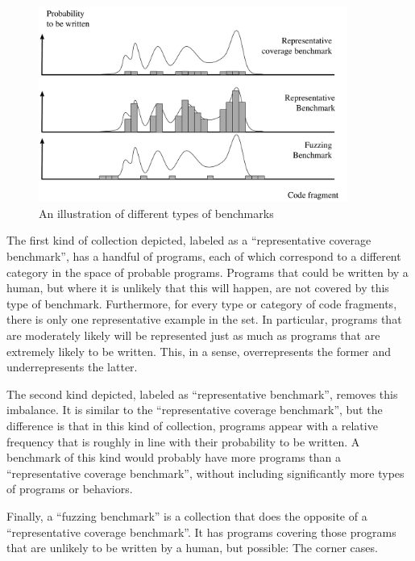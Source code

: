 \begin{figure}[h]
	\centering
	\includegraphics[width=0.9\textwidth]{figures/benchmark_types.pdf}
	\caption{An illustration of different types of benchmarks}
	\label{fig:benchmark_types}
\end{figure}

The first kind of collection depicted, labeled as a ``representative coverage benchmark'', has a handful of programs, each of which correspond to a different category in the space of probable programs.
Programs that could be written by a human, but where it is unlikely that this will happen, are not covered by this type of benchmark. Furthermore, for every type or category of code fragments, there is only one representative example in the set.
In particular, programs that are moderately likely will be represented just as much as programs that are extremely likely to be written. This, in a sense, overrepresents the former and underrepresents the latter.

The second kind depicted, labeled as ``representative benchmark'', removes this imbalance. It is similar to the ``representative coverage benchmark'', but the difference is that in this kind of collection, programs appear with a relative frequency that is roughly in line with their probability to be written.
A benchmark of this kind would probably have more programs than a ``representative coverage benchmark'', without including significantly more types of programs or behaviors.

Finally, a ``fuzzing benchmark'' is a collection that does the opposite of a ``representative coverage benchmark''. It has programs covering those programs that are unlikely to be written by a human, but possible: The corner cases.


